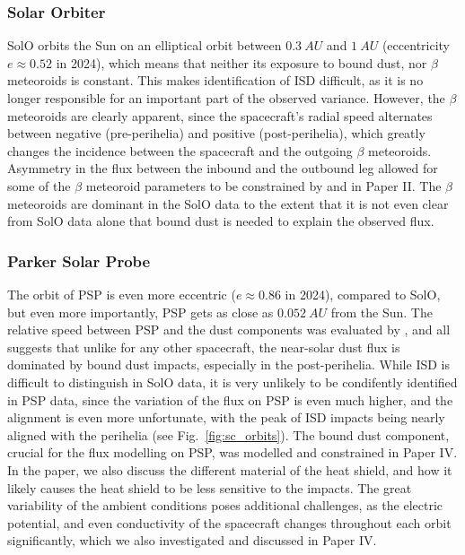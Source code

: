 \subsubsection{Solar Orbiter}

SolO orbits the Sun on an elliptical orbit between $\SI{0.3}{AU}$ and $\SI{1}{AU}$ (eccentricity $e \approx 0.52$ in 2024), which means that neither its exposure to bound dust, nor $\beta$ meteoroids is constant. This makes identification of ISD difficult, as it is no longer responsible for an important part of the observed variance. However, the $\beta$ meteoroids are clearly apparent, since the spacecraft's radial speed alternates between negative (pre-perihelia) and positive (post-perihelia), which greatly changes the incidence between the spacecraft and the outgoing $\beta$ meteoroids. Asymmetry in the flux between the inbound and the outbound leg allowed for some of the $\beta$ meteoroid parameters to be constrained by \citet{zaslavsky2021first} and in Paper II. The $\beta$ meteoroids are dominant in the SolO data to the extent that it is not even clear from SolO data alone that bound dust is needed to explain the observed flux.

\subsubsection{Parker Solar Probe}

The orbit of PSP is even more eccentric ($e \approx 0.86$ in 2024), compared to SolO, but even more importantly, PSP gets as close as $\SI{0.052}{AU}$ from the Sun. The relative speed between PSP and the dust components was evaluated by \citet{szalay2020near}, and all suggests that unlike for any other spacecraft, the near-solar dust flux is dominated by bound dust impacts, especially in the post-perihelia. While ISD is difficult to distinguish in SolO data, it is very unlikely to be condifently identified in PSP data, since the variation of the flux on PSP is even much higher, and the alignment is even more unfortunate, with the peak of ISD impacts being nearly aligned with the perihelia (see Fig.~\ref{fig:sc_orbits}). The bound dust component, crucial for the flux modelling on PSP, was modelled and constrained in Paper IV. In the paper, we also discuss the different material of the heat shield, and how it likely causes the heat shield to be less sensitive to the impacts. The great variability of the ambient conditions poses additional challenges, as the electric potential, and even conductivity of the spacecraft changes throughout each orbit significantly, which we also investigated and discussed in Paper IV.

